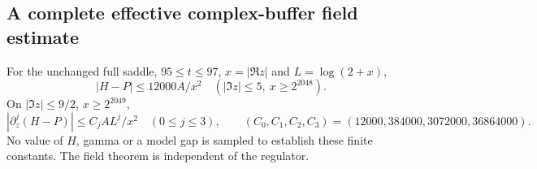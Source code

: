 \subsection{A complete effective complex-buffer field estimate}
\begin{theorem}\label{thm:effective-outer}
For the unchanged full saddle, $95\le t\le97$, $x=|\Re z|$ and
$L=\log(2+x)$,
\begin{equation}
 |H-P|\le12000A/x^2\quad(|\Im z|\le5,\ x\ge2^{2048}).
 \label{eq:ef-field}
\end{equation}
On $|\Im z|\le9/2$, $x\ge2^{2049}$,
\begin{equation}
 |\partial_z^j(H-P)|\le C_j A L^j/x^2\quad(0\le j\le3),\qquad
 (C_0,C_1,C_2,C_3)=(12000,384000,3072000,36864000).
 \label{eq:ef-jets}
\end{equation}
No value of $H$, gamma or a model gap is sampled to establish these
finite constants. The field theorem is independent of the regulator.
\end{theorem}

